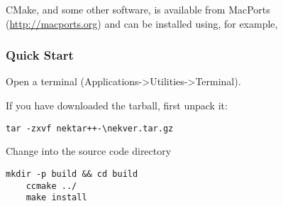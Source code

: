 \begin{tipbox}
CMake, and some other software, is available from MacPorts
(\url{http://macports.org}) and can be installed using, for example,

\noindent\usebox\installationOSXMacPortsTip
\end{tipbox}


\subsubsection{Quick Start}
Open a terminal (Applications->Utilities->Terminal).

If you have downloaded the tarball, first unpack it:
\begin{lstlisting}[style=BashInputStyle]
    tar -zxvf nektar++-\nekver.tar.gz
\end{lstlisting}
Change into the  source code directory
\begin{lstlisting}[style=BashInputStyle]
    mkdir -p build && cd build 
    ccmake ../
    make install
\end{lstlisting}

